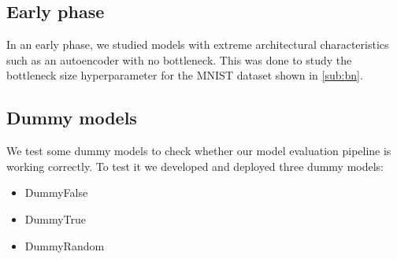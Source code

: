     
        \subsection{Early phase}
        
            In an early phase, we studied models with extreme architectural characteristics such as an autoencoder with no bottleneck. This was done to study the bottleneck size hyperparameter for the MNIST dataset shown in \autoref{sub:bn}.
        
    
        
        \subsection{Dummy models}
        
            We test some dummy models to check whether our model evaluation pipeline is working correctly. To test it we developed and deployed three dummy models:
            \begin{itemize}
                \item DummyFalse
                \item DummyTrue
                \item DummyRandom
            \end{itemize}
            
